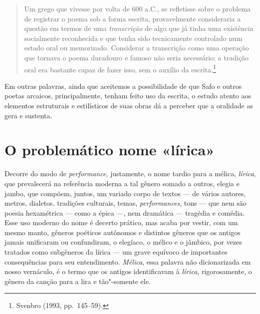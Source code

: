\begin{quote}
Um grego que vivesse por volta de 600 a.C., se refletisse sobre o problema de
registrar o poema sob a forma escrita, provavelmente consideraria a questão em
termos de uma \textit{transcrição} de algo que já tinha uma existência
socialmente reconhecida e que tenha sido tecnicamente controlado num estado
oral ou memorizado. Considerar a transcrição como uma operação que tornava o
poema duradouro e famoso não seria necessário; a tradição oral era bastante
capaz de fazer isso, sem o auxílio da escrita.\footnote{ Svenbro (1993, pp.~145--59).}
\end{quote}

Em outras palavras, ainda que aceitemos a possibilidade de que Safo e outros
poetas arcaicos, principalmente, tenham feito uso da escrita, o estudo atento
aos elementos estruturais e estilísticos de suas obras dá a perceber que a oralidade as gera e
sustenta.

\section*{O problemático nome «lírica»}

Decorre do modo de \textit{performance}, justamente, o nome tardio para a mélica,
\textit{lírica}, que prevalecerá na referência moderna a tal gênero somado a outros, elegia e jambo, que compõem, juntos, um variado corpo de
textos --- de vários autores, metros, dialetos, tradições culturais, temas,
\textit{performances}, tons --- que nem são poesia hexamétrica --- como a
épica ---, nem dramática --- tragédia e comédia. Esse uso moderno do nome é decerto
prático, mas acaba por vestir, com um mesmo manto,
gêneros poéticos autônomos e distintos gêneros que os antigos jamais unificaram ou confundiram, o elegíaco, o mélico e o jâmbico, por vezes tratados como subgêneros da lírica --- um grave equívoco de importantes consequências para seu entendimento. \textit{Mélica}, essa palavra não
dicionarizada em nosso vernáculo, é o termo que os antigos identificavam à
\textit{lírica}, rigorosamente, o gênero da canção para a lira e tão"-somente ele. 

